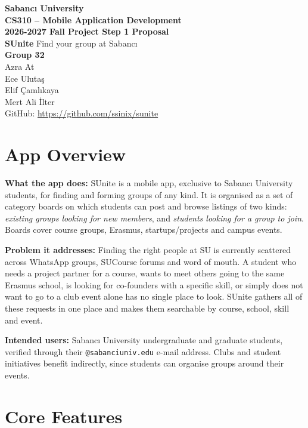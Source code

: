 \documentclass[11pt,a4paper]{article}
\newcommand{\appname}{SUnite}
\begin{document}
\begin{center}
  {\large\bfseries Sabancı University}\\[0.6ex]
  {\large\bfseries CS310 -- Mobile Application Development}\\[0.6ex]
  {\large\bfseries 2026-2027 Fall Project Step 1 Proposal}\\[2.5ex]
  {\LARGE\bfseries \appname{}} 
  Find your group at Sabancı\\[2ex]
  {\bfseries Group 32}\\[1.5ex]
  Azra At \\
  Ece Ulutaş \\
  Elif Çamlıkaya \\
  Mert Ali İlter \\[1.5ex]
  GitHub: \url{https://github.com/ssinix/sunite}
\end{center}

\section{App Overview}

\textbf{What the app does:} \appname{} is a mobile app, exclusive to Sabancı
University students, for finding and forming groups of any kind. It is
organised as a set of category boards on which students can post and browse
listings of two kinds: \emph{existing groups looking for new members}, and
\emph{students looking for a group to join}. Boards cover course groups,
Erasmus, startups/projects and campus events.

\textbf{Problem it addresses:} Finding the right people at SU is currently
scattered across WhatsApp groups, SUCourse forums and word of
mouth. A student who needs a project partner for a course, wants to meet others
going to the same Erasmus school, is looking for co-founders with a specific
skill, or simply does not want to go to a club event alone has no single place
to look. \appname{} gathers all of these requests in one place and makes them
searchable by course, school, skill and event.

\textbf{Intended users:} Sabancı University undergraduate and graduate
students, verified through their \texttt{@sabanciuniv.edu} e-mail address.
Clubs and student initiatives benefit indirectly, since students can organise
groups around their events.

\section{Core Features}
\end{document}
